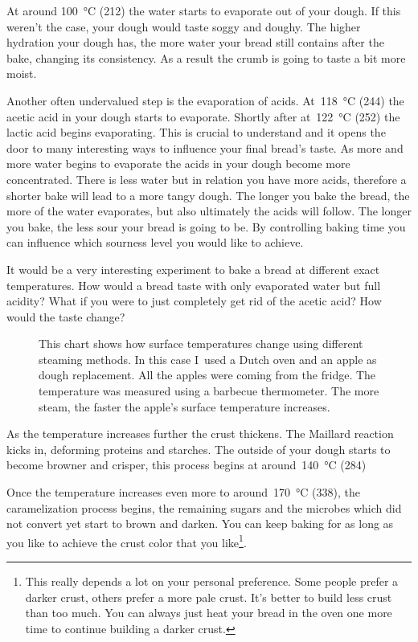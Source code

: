 At around  \qty{100}{\degreeCelsius} (\qty{212}{\degF}) the water starts to evaporate out of your
dough. If this weren't the case, your dough would taste soggy and
doughy. The higher hydration your dough has, the more water your bread
still contains after the bake, changing its consistency.  As a result the
crumb is going to taste a bit more moist.

Another often undervalued step is the evaporation of acids.
At~\qty{118}{\degreeCelsius} (\qty{244}{\degF}) the acetic acid in your dough
starts to evaporate.
Shortly after at~\qty{122}{\degreeCelsius} (\qty{252}{\degF}) the lactic acid begins evaporating.
This is crucial to understand and it opens the door to many interesting
ways to influence your final bread's taste. As more and more water
begins to evaporate the acids in your dough become more concentrated.
There is less water but in relation you have more acids, therefore a shorter
bake will lead to a more tangy dough. The longer you bake the bread,
the more of the water evaporates, but also ultimately the acids will follow.
The longer you bake, the less sour your bread is going to be. By controlling
baking time you can influence which sourness level you would like to achieve.

It would be a very interesting experiment to bake a bread at different exact
temperatures. How would a bread taste with only evaporated water but
full acidity? What if you were to just completely get rid of the acetic
acid? How would the taste change?

\begin{figure}[!htb]
  
  \caption[Surface temperature for different steaming methods]{This
      chart shows how surface temperatures change using different steaming
      methods. In this case I~used a Dutch oven and an apple as dough
      replacement. All the apples were coming from the fridge. The temperature
      was measured using a barbecue thermometer.  The more steam, the faster
      the apple's surface temperature increases.}
\end{figure}

As the temperature increases further the crust thickens. The Maillard reaction
kicks in, deforming proteins and starches. The outside of your dough starts to
become browner and crisper, this process begins at
around~\qty{140}{\degreeCelsius} (\qty{284}{\degF})

Once the temperature increases even more to around~\qty{170}{\degreeCelsius}
(\qty{338}{\degF}),
the caramelization process begins, the remaining sugars and the microbes which
did not convert yet start to brown and darken. You can keep baking
for as long as you like to achieve the crust color that you
like\footnote{This really depends a lot on your personal preference.
Some people prefer a darker crust, others prefer a more pale crust.
It's better to build less crust than too much. You can always just
heat your bread in the oven one more time to continue building a
darker crust.}.

